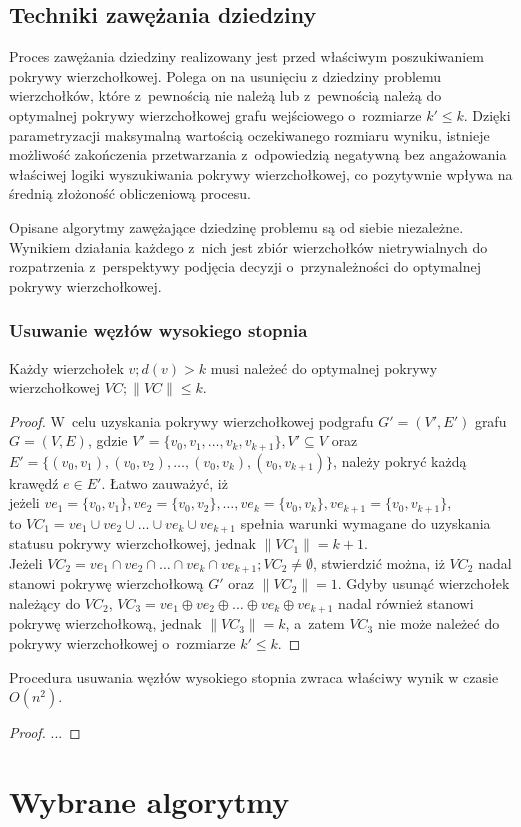 \section {Techniki zawężania dziedziny}\label{Section_kernelization}

Proces zawężania dziedziny realizowany jest przed właściwym poszukiwaniem
pokrywy wierzchołkowej. Polega on na usunięciu z dziedziny problemu
wierzchołków, które z~pewnością nie należą lub z~pewnością należą do optymalnej
pokrywy wierzchołkowej grafu wejściowego o~rozmiarze $k\prime \leq k$.
Dzięki parametryzacji maksymalną wartością oczekiwanego rozmiaru wyniku,
istnieje możliwość zakończenia przetwarzania z~odpowiedzią negatywną bez
angażowania właściwej logiki wyszukiwania pokrywy wierzchołkowej, co pozytywnie
wpływa na średnią złożoność obliczeniową procesu.

Opisane algorytmy zawężające dziedzinę problemu są od siebie niezależne.
Wynikiem działania każdego z~nich jest zbiór wierzchołków nietrywialnych do
rozpatrzenia z~perspektywy podjęcia decyzji o~przynależności do optymalnej
pokrywy wierzchołkowej.

\subsection {Usuwanie węzłów wysokiego stopnia}\label{section_kernelization_high-degree}

\begin{theorem}
  Każdy wierzchołek $v; d(v) > k $ musi należeć do optymalnej pokrywy wierzchołkowej 
  $VC; \|VC\| \leq k$.
\end{theorem}
\begin{proof}
  W~celu uzyskania pokrywy wierzchołkowej podgrafu $G\prime=(V\prime,E\prime)$
  grafu $G=(V,E)$, gdzie $V\prime=\{v_0, v_1, \ldots, v_k, v_{k+1}\}, V\prime
  \subseteq V$ oraz \\
  $E\prime=\{(v_0,v_1), (v_0,v_2), \ldots, (v_0, v_k), (v_0,v_{k+1})\}$,
  należy pokryć każdą krawędź $e \in E\prime$.
  Łatwo zauważyć, iż \\ jeżeli $ve_1=\{v_0,v_1\}, ve_2=\{v_0,v_2\}, \ldots,
  ve_k=\{v_0,v_k\},ve_{k+1}=\{v_0,v_{k+1}\}$,\\
  to $VC_1=ve_1 \cup ve_2 \cup \ldots \cup ve_k \cup ve_{k+1}$ spełnia warunki 
  wymagane do uzyskania statusu pokrywy wierzchołkowej, jednak $\|VC_1\| = k +1$.\\
  Jeżeli $VC_2=ve_1 \cap ve_2 \cap \ldots \cap ve_k \cap ve_{k+1}; VC_2 \neq \emptyset$,
  stwierdzić można, iż $VC_2$ nadal stanowi pokrywę wierzchołkową $G\prime$ oraz
  $\|VC_2\|=1$.
  Gdyby usunąć wierzchołek należący do $VC_2$, $VC_3=ve_1 \oplus ve_2 \oplus \ldots \oplus ve_k \oplus ve_{k+1}$ nadal
  również stanowi pokrywę wierzchołkową, jednak $\|VC_3\|=k$, a~zatem $VC_3$ nie
  może należeć do pokrywy wierzchołkowej o~rozmiarze $k\prime \leq k$.
\end{proof}

\begin{theorem}
  Procedura usuwania węzłów wysokiego stopnia zwraca właściwy wynik w czasie
  $O(n^2)$.
\end{theorem}
\begin{proof}
  ...
\end{proof}
\chapter{Wybrane algorytmy }\label{Chapter_Algorytmy}

